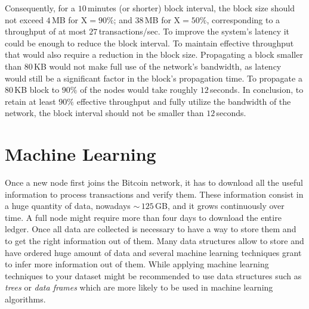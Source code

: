 \documentclass[USenglish]{uit-thesis}
\begin{document}
Consequently, for a $10$\,minutes (or shorter) block interval,
the block size should not exceed $4$\,MB for $\text{X} = 90\%$;
and $38$\,MB for $\text{X} = 50\%$, corresponding to a throughput
of at most $27$\,transactions/sec.
To improve the system's latency it could be enough
to reduce the block interval. To maintain effective
throughput that would also require a reduction in the
block size. Propagating a block smaller than $80$\,KB would
not make full use of the network's bandwidth, as latency would
still be a significant factor in the block's propagation time.
To propagate a $80$\,KB block to $90\%$ of the nodes would
take roughly $12$\,seconds. In conclusion, to retain at least $90\%$
effective throughput and fully utilize the bandwidth of the network,
the block interval should not be smaller than $12$\,seconds.

\section{Machine Learning}
\label{sec:machinelearning}
Once a new node first joins the Bitcoin network, it has to download
all the useful information to process transactions and
verify them. These information consist in a huge quantity
of data, nowadays $\sim$\,$125$\,GB, and it grows
continuously over time.
A full node might require more than four days to 
download the entire ledger. Once all data are
collected is necessary to have a way to
store them and to get the right information
out of them. Many data structures allow to
store and have ordered huge amount of
data and several machine learning
techniques grant to infer more information
out of them. While applying machine
learning techniques to your dataset
might be recommended to use
data structures such as \emph{trees}
or \emph{data frames} which are
more likely to be used in machine learning
algorithms.
\end{document}
